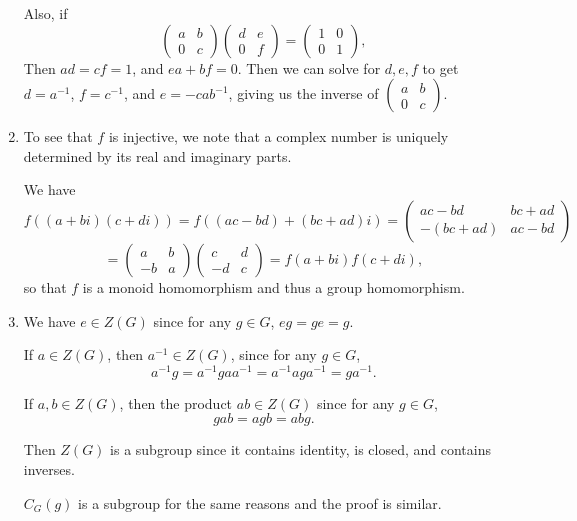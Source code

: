 \documentclass[11pt, reqno]{article}
\begin{document}
\begin{enumerate}
    Also, if 
    \[
    \begin{pmatrix}
        a & b \\ 0 & c
    \end{pmatrix}
    \begin{pmatrix}
        d & e \\ 0 & f
    \end{pmatrix}
    = \begin{pmatrix}
        1 & 0 \\ 0 & 1
    \end{pmatrix},
    \]
    Then $ad = cf = 1$, and $ea + bf = 0$. Then we can solve for $d, e, f$ to get $d = a^{-1}$, 
    $f = c^{-1}$, and $e = -cab^{-1}$, giving us the inverse of $\left(\begin{smallmatrix}
        a & b \\ 0 & c
    \end{smallmatrix}\right)$.

    \item To see that $f$ is injective, we note that a complex number is uniquely determined by 
    its real and imaginary parts. 

    We have 
    \[
    f((a + bi)(c + di)) = f((ac - bd) + (bc + ad)i) = \begin{pmatrix}
        ac - bd & bc + ad \\ -(bc + ad) & ac - bd
    \end{pmatrix}
    \]
    \[
    = \begin{pmatrix}
        a & b \\ -b & a
    \end{pmatrix}
    \begin{pmatrix}
        c & d \\ -d & c
    \end{pmatrix}
    =f(a + bi)f(c + di),\]
    so that $f$ is a monoid homomorphism and thus a group homomorphism.

    \item We have $e \in Z(G)$ since for any $g \in G$, $eg = ge = g$.
    
    If $a \in Z(G)$, then $a^{-1} \in Z(G)$, since for any $g \in G$, 
    \[a^{-1}g = a^{-1}gaa^{-1} = 
    a^{-1}aga^{-1} = ga^{-1}.\]

    If $a,b \in Z(G)$, then the product $ab \in Z(G)$ since for any $g \in G$,
    \[
    gab = agb = abg.
    \]

    Then $Z(G)$ is a subgroup since it contains identity, is closed, and contains inverses.

    $C_G(g)$ is a subgroup for the same reasons and the proof is similar.

\end{enumerate}
\end{document}
